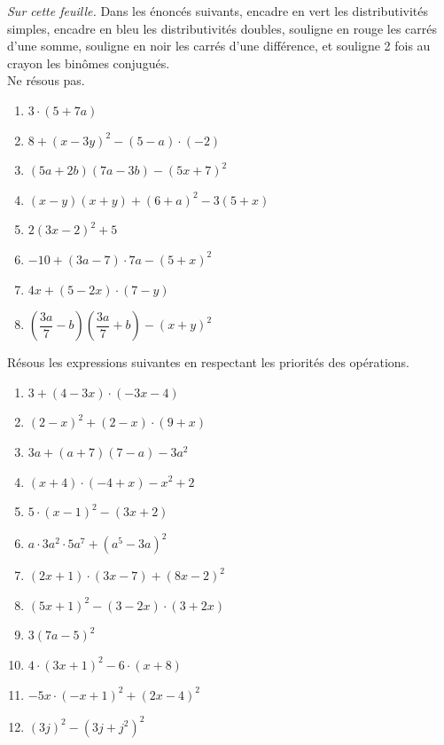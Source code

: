 \documentclass[../../syllabus_2.tex]{subfiles}
\begin{document}
\setcounter{exercise}{0}
\begin{exercise}
  \emph{Sur cette feuille.} Dans les énoncés suivants, encadre en vert les distributivités simples, encadre en bleu les distributivités doubles, souligne en rouge les carrés d'une somme, souligne en noir les carrés d'une différence, et souligne 2 fois au crayon les binômes conjugués. \\ Ne résous pas. 
  \begin{enumerate}[cols=2, itemsep=2em]
    \item \(3\cdot (5+7a)\)
    \item \(8 + (x-3y)^2 - (5-a) \cdot (-2)\)
    \item \((5a + 2b)(7a - 3b) - (5x+7)^2\)
    \item \((x-y)(x+y) + (6+a)^2 - 3(5+x)\)
    \item \(2(3x-2)^2+5\)
    \item \(-10+(3a - 7)\cdot 7a - (5+x)^2 \)
    \item \(4x + (5-2x)\cdot (7-y)\)
    \item \(\left(\dfrac{3a}{7}-b\right)\left(\dfrac{3a}{7}+b\right) - (x+y)^2\)
  \end{enumerate}
\end{exercise}

\begin{exercise}
  Résous les expressions suivantes en respectant les priorités des opérations.
  \begin{enumerate}[cols=2, itemsep=2em]
    \item $3+(4-3x)\cdot(-3x-4)$
    \item $(2-x)^2 + (2-x)\cdot(9+x)$
    \item $3a + \left(a+7\right)\left(7-a\right)-3a^2$
    \item $(x+4)\cdot(-4+x)-x^2+2$
    \item $5\cdot(x-1)^2-(3x+2)$
    \item $a\cdot 3a^2 \cdot 5a^7 + \left(a^5-3a\right)^2$
    \item $(2x+1)\cdot(3x-7)+(8x-2)^2$
    \item $(5x+1)^2-(3-2x)\cdot(3+2x)$
    \item $3\left(7a-5\right)^2$
    \item $4\cdot(3x+1)^2-6\cdot(x+8)$
    \item $-5x\cdot(-x+1)^2+(2x-4)^2$
    \item $\left(3j\right)^2 - \left(3j+j^2\right)^2$
  \end{enumerate}
\end{exercise}
\end{document}
